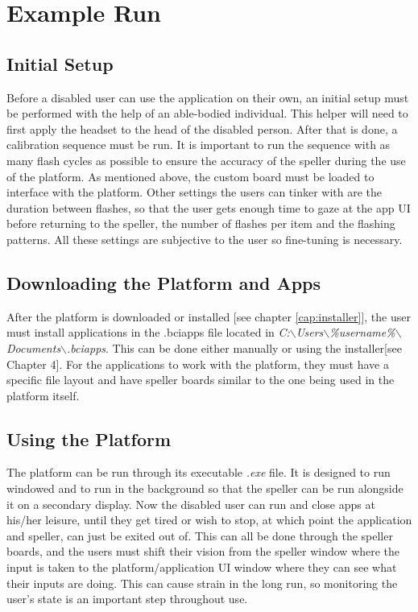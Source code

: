 \section{Example Run} \label{sect:Example Run}
\subsection{Initial Setup}
Before a disabled user can use the application on their own, an initial setup must be performed with the help of an able-bodied individual. This helper will need to first apply the headset to the head of the disabled person. After that is done, a calibration sequence must be run. It is important to run the sequence with as many flash cycles as possible to ensure the accuracy of the speller during the use of the platform. As mentioned above, the custom board must be loaded to interface with the platform. Other settings the users can tinker with are the duration between flashes, so that the user gets enough time to gaze at the app UI before returning to the speller, the number of flashes per item and the flashing patterns. All these settings are subjective to the user so fine-tuning is necessary.

\subsection{Downloading the Platform and Apps}
After the platform is downloaded or installed [see chapter \ref{cap:installer}], the user must install applications in the .bciapps file located in \textit{C:$\backslash$Users$\backslash$\%username\%$\backslash$Documents$\backslash$.bciapps}. This can be done either manually or using the installer[see Chapter 4]. For the applications to work with the platform, they must have a specific file layout and have speller boards similar to the one being used in the platform itself.
\subsection{Using the Platform}
The platform can be run through its executable \textit{.exe} file. It is designed to run windowed and to run in the background so that the speller can be run alongside it on a secondary display. Now the disabled user can run and close apps at his/her leisure, until they get tired or wish to stop, at which point the application and speller, can just be exited out of. This can all be done through the speller boards, and the users must shift their vision from the speller window where the input is taken to the platform/application UI window where they can see what their inputs are doing. This can cause strain in the long run, so monitoring the user's state is an important step throughout use.

